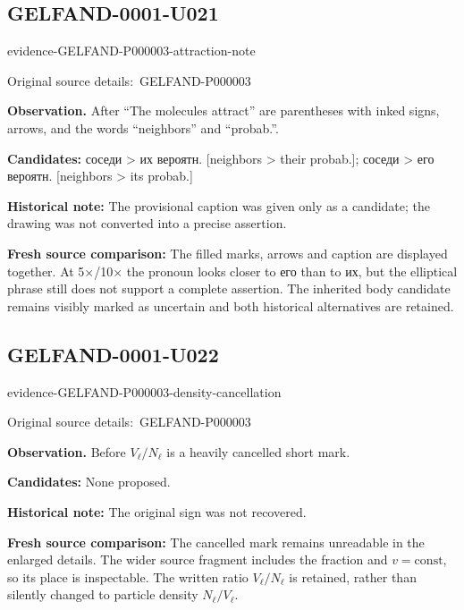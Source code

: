 \documentclass[11pt]{article}
\newcommand{\EvidenceBlock}[4]{%
 \par\smallskip\noindent\begin{minipage}{\linewidth}
 \begin{minipage}[t]{.47\linewidth}\vspace{0pt}\centering
 \csname evidence-#1-#2\endcsname\par
 {\scriptsize\SourceCropCaption\ #1}\par
 \end{minipage}\hfill
 \begin{minipage}[t]{.49\linewidth}\vspace{0pt}\raggedright
 {\small\color{orange!65!black}\textbf{#4} #3}\par
 \end{minipage}
 \end{minipage}\par\smallskip}
\newcommand{\SourceCropCaption}{Original source details:}\newcommand{\ReadingCaption}{Uncertain reading.}\newcommand{\IncompleteCaption}{Undeciphered passage.}\newcommand{\DiagramCaption}{Diagram and typed description.}
\begin{document}
\subsection*{GELFAND-0001-U021}
\EvidenceBlock{GELFAND-P000003}{attraction-note}{After “The molecules attract” are parentheses with inked signs, arrows, and the words “neighbors” and “probab.”.}{Observation.}
\par\smallskip\noindent\textbf{Candidates: } соседи > их вероятн. [neighbors > their probab.]; соседи > его вероятн. [neighbors > its probab.]\par
\par\smallskip\noindent\textbf{Historical note: } The provisional caption was given only as a candidate; the drawing was not converted into a precise assertion.\par
\par\smallskip\noindent\textbf{Fresh source comparison: } The filled marks, arrows and caption are displayed together. At 5×/10× the pronoun looks closer to его than to их, but the elliptical phrase still does not support a complete assertion. The inherited body candidate remains visibly marked as uncertain and both historical alternatives are retained.\par

\subsection*{GELFAND-0001-U022}
\EvidenceBlock{GELFAND-P000003}{density-cancellation}{Before \(V_\ell/N_\ell\) is a heavily cancelled short mark.}{Observation.}
\par\smallskip\noindent\textbf{Candidates: } None proposed.\par
\par\smallskip\noindent\textbf{Historical note: } The original sign was not recovered.\par
\par\smallskip\noindent\textbf{Fresh source comparison: } The cancelled mark remains unreadable in the enlarged details. The wider source fragment includes the fraction and \(v=\mathrm{const}\), so its place is inspectable. The written ratio \(V_\ell/N_\ell\) is retained, rather than silently changed to particle density \(N_\ell/V_\ell\).\par
\end{document}

